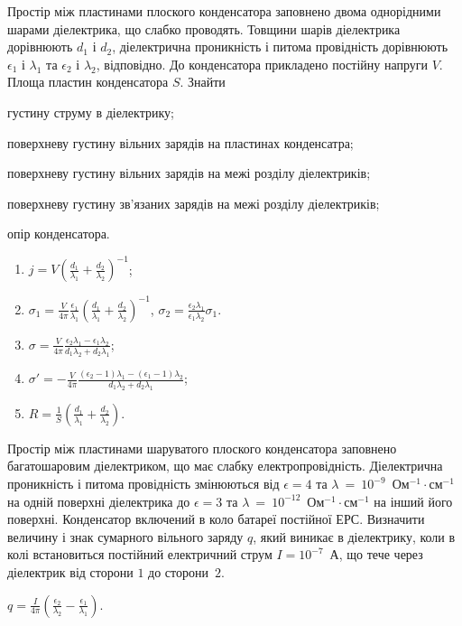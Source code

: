 \begin{problem}%
Простір між пластинами плоского конденсатора заповнено двома однорідними шарами діелектрика, що слабко проводять. Товщини шарів діелектрика дорівнюють $d_1$ і $d_2$, діелектрична проникність і питома провідність дорівнюють $\epsilon_1$ і $\lambda_1$ та $\epsilon_2$ і $\lambda_2$, відповідно. До конденсатора прикладено постійну напруги $V$. Площа пластин конденсатора $S$. Знайти
	\begin{enumerate*}[label=\alph*)]
		\item густину струму в діелектрику;
		\item поверхневу густину вільних зарядів на пластинах конденсатра;
		\item поверхневу густину вільних зарядів на межі розділу діелектриків;
		\item поверхневу густину зв'язаних зарядів на межі розділу діелектриків;
		\item опір конденсатора.
	\end{enumerate*}

\begin{solution}
	\begin{enumerate}[label=\alph*)]
		\item  $j = V\left( \frac{d_1}{\lambda_1} + \frac{d_2}{\lambda_2}\right)^{-1}$;
		\item $\sigma_1  = \frac{V}{4\pi} \frac{\epsilon_1}{\lambda_1} \left( \frac{d_1}{\lambda_1} + \frac{d_2}{\lambda_2}\right)^{-1}$, $\sigma_2  = \frac{\epsilon_2\lambda_1}{\epsilon_1\lambda_2} \sigma_1$.
		\item $\sigma = \frac{V}{4\pi} \frac{\epsilon_2\lambda_1 - \epsilon_1\lambda_2}{d_1\lambda_2 + d_2\lambda_1}$;
		\item $\sigma' = - \frac{V}{4\pi} \frac{(\epsilon_2 - 1)\lambda_1 - (\epsilon_1 - 1)\lambda_2}{d_1\lambda_2 + d_2\lambda_1}$;
		\item $R = \frac1S\left( \frac{d_1}{\lambda_1} + \frac{d_2}{\lambda_2}\right) $.
	\end{enumerate}
\end{solution}
\end{problem}

\begin{problem} %
Простір між пластинами шаруватого плоского конденсатора заповнено багатошаровим діелектриком, що має слабку електропровідність. Діелектрична проникність і питома провідність змінюються від $\epsilon = 4$ та $\lambda~=~10^{-9}$~Ом$^{-1}\cdot$см$^{-1}$ на одній поверхні діелектрика до $\epsilon = 3$ та  $\lambda~=~10^{-12}$~Ом$^{-1}\cdot$см$^{-1}$ на інший його поверхні. Конденсатор включений в коло батареї постійної ЕРС. Визначити величину і знак сумарного вільного заряду $q$, який виникає в діелектрику, коли в колі встановиться постійний електричний струм $I = 10^{-7}$~А, що тече через діелектрик від сторони $1$ до сторони~$2$.
\begin{solution}
	$q  = \frac{I}{4\pi} \left( \frac{\epsilon_2}{\lambda_2} - \frac{\epsilon_1}{\lambda_1}\right) $.
\end{solution}
\end{problem}


